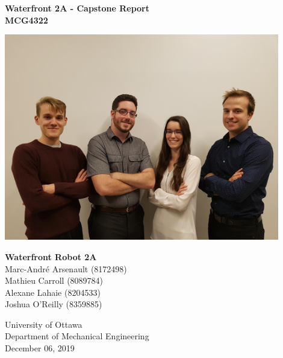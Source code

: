 
\begin{titlepage}
    \begin{center}
        \textbf{Waterfront 2A - Capstone Report}\\
        \textbf{MCG4322}
        
        \vfill
        
        \includegraphics[width=12cm]{team_picture.jpg}
        
        \vfill
        
        \textbf{Waterfront Robot 2A}\\
        Marc-André Arsenault (8172498)\\
        Mathieu Carroll (8089784)\\
        Alexane Lahaie (8204533)\\
        Joshua O'Reilly (8359885)\\
  
        \vfill
  
        University of Ottawa\\
        Department of Mechanical Engineering\\
        December 06, 2019
  
    \end{center}
 \end{titlepage}
